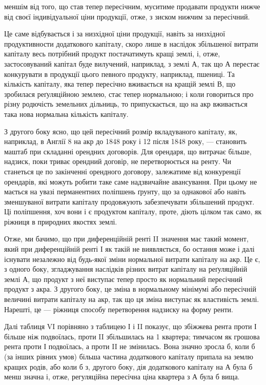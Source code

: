 \parcont{}  %
меншім від того, що став тепер пересічним, муситиме продавати продукти
нижче від своєї індивідуальної ціни продукції, отже, з зиском нижчим за
пересічний.

Це саме відбувається і за низхідної ціни продукції, навіть за низхідної продуктивности
додаткового капіталу, скоро лише в наслідок збільшеної витрати капіталу
весь потрібний продукт постачатимуть кращі землі, і, отже, застосовуваний капітал
буде вилучений, наприклад, з землі $А$, так що $А$ перестає конкурувати в продукції
цього певного продукту, наприклад, пшениці. Та кількість капіталу, яка
тепер пересічно вживається на кращій землі $В$, що зробилася реґуляційною
землею, стає тепер нормальною; і коли говориться про різну родючість земельних
дільниць, то припускається, що на акр вживається така нова нормальна
кількість капіталу.

З другого боку ясно, що цей пересічний розмір вкладуваного капіталу, як,
наприклад, в Англії 8 на акр до 1848 року і 12 після 1848 року, —
становить маштаб при складанні орендних договорів. Для орендаря, що витрачає
більше, надзиск, поки триває орендний договір, не перетворюється на ренту. Чи
станеться це по закінченні орендного договору, залежатиме від конкуренції орендарів,
які можуть робити таке саме надзвичайне авансування. При цьому не мається
на увазі перманентних поліпшень ґрунту, що за однакової або навіть зменшуваної
витрати капіталу продовжують забезпечувати збільшений продукт. Ці поліпшення,
хоч вони і є продуктом капіталу, проте, діють цілком так само, як
ріжниця в природних якостях землі.

Отже, ми бачимо, що при диференційній ренті II значення має такий момент,
який при диференційній ренті І як такій не виявляється, бо остання може
і далі існувати незалежно від будь-якої зміни нормальної витрати капіталу
на акр. Це є, з одного боку, згладжування наслідків різних витрат капіталу
на реґуляційній землі $А$, що продукт з неї виступає тепер просто як нормальний
пересічний продукт з акра. З другого боку, це зміна в нормальному мінімумі
або пересічній величині витрати капіталу на акр, так що ця зміна виступає як
властивість землі. Нарешті, це — ріжниця способу перетворення надзиску на форму
ренти.

Далі таблиця VI порівняно з таблицею І і II показує, що збіжжева рента
проти І більше ніж подвоїлась, проти II збільшилась на 1  квартера; тимчасом
як грошова рента проти І подвоїлась, а проти II не змінилась. Вона значно
зросла б, коли б (за інших рівних умов) більша частина додаткового капіталу
припала на землю кращих родів, або коли б з, другого боку, дія додаткового
капіталу на $А$ була б менш значна і, отже, регуляційна пересічна ціна квартера
з $А$ була б вища.


